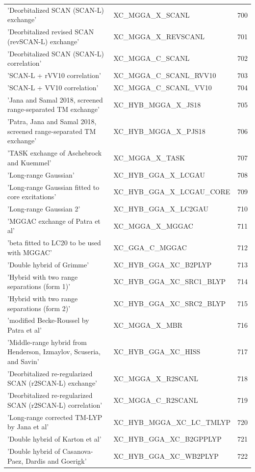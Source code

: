 \documentclass[final,12pt,makeidx,DIV=calc]{article}
\begin{document}
{{{{{{\begin{table}[!h]
\begin{center}
\begin{tabular}{llr}
  'Deorbitalized SCAN (SCAN-L) exchange' & XC\_MGGA\_X\_SCANL  &700\\
  'Deorbitalized revised SCAN (revSCAN-L) exchange' & XC\_MGGA\_X\_REVSCANL  &701\\
  'Deorbitalized SCAN (SCAN-L) correlation' & XC\_MGGA\_C\_SCANL  &702\\
  'SCAN-L + rVV10 correlation' & XC\_MGGA\_C\_SCANL\_RVV10  &703\\
  'SCAN-L + VV10 correlation' & XC\_MGGA\_C\_SCANL\_VV10  &704\\
  'Jana and Samal 2018, screened range-separated TM exchange' & XC\_HYB\_MGGA\_X\_JS18  &705\\
  'Patra, Jana and Samal 2018, screened range-separated TM exchange' & XC\_HYB\_MGGA\_X\_PJS18  &706\\
  'TASK exchange of Aschebrock and Kuemmel' & XC\_MGGA\_X\_TASK  &707\\
  'Long-range Gaussian' & XC\_HYB\_GGA\_X\_LCGAU  &708\\
  'Long-range Gaussian fitted to core excitations' & XC\_HYB\_GGA\_X\_LCGAU\_CORE  &709\\
  'Long-range Gaussian 2' & XC\_HYB\_GGA\_X\_LC2GAU  &710\\
  'MGGAC exchange of Patra et al' & XC\_MGGA\_X\_MGGAC  &711\\
  'beta fitted to LC20 to be used with MGGAC' & XC\_GGA\_C\_MGGAC  &712\\
  'Double hybrid of Grimme' & XC\_HYB\_GGA\_XC\_B2PLYP  &713\\
  'Hybrid with two range separations (form 1)' & XC\_HYB\_GGA\_XC\_SRC1\_BLYP  &714\\
  'Hybrid with two range separations (form 2)' & XC\_HYB\_GGA\_XC\_SRC2\_BLYP  &715\\
  'modified Becke-Roussel by Patra et al' & XC\_MGGA\_X\_MBR  &716\\
  'Middle-range hybrid from Henderson, Izmaylov, Scuseria, and Savin' & XC\_HYB\_GGA\_XC\_HISS  &717\\
  'Deorbitalized re-regularized SCAN (r2SCAN-L) exchange' & XC\_MGGA\_X\_R2SCANL  &718\\
  'Deorbitalized re-regularized SCAN (r2SCAN-L) correlation' & XC\_MGGA\_C\_R2SCANL  &719\\
  'Long-range corrected TM-LYP by Jana et al' & XC\_HYB\_MGGA\_XC\_LC\_TMLYP  &720\\
  'Double hybrid of Karton et al' & XC\_HYB\_GGA\_XC\_B2GPPLYP  &721\\
  'Double hybrid of Casanova-Paez, Dardis and Goerigk' & XC\_HYB\_GGA\_XC\_WB2PLYP  &722\\

\end{tabular}
\end{center}
\end{table}}}}}}}
\end{document}
